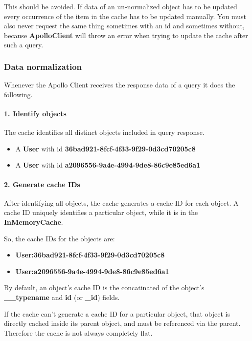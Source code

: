 This should be avoided. If data of an un-normalized object has to be updated every occurrence of the item in the cache has to be updated manually. You must also never request the same thing sometimes with an id and sometimes without, because \textbf{ApolloClient} will throw an error when trying to update the cache after such a query.

\subsubsection{Data normalization}

Whenever the Apollo Client receives the response data of a query it does the following. 

\paragraph{1. Identify objects} 

The cache identifies all distinct objects included in query response.

\begin{itemize}
  \item A \textbf{User} with id \textbf{36bad921-8fcf-4f33-9f29-0d3cd70205c8}
  \item A \textbf{User} with id \textbf{a2096556-9a4e-4994-9de8-86c9e85ed6a1}
\end{itemize}

\paragraph{2. Generate cache IDs} 

After identifying all objects, the cache generates a cache ID for each object. A cache ID uniquely identifies a particular object, while it is in the \textbf{InMemoryCache}.

So, the cache IDs for the objects are: 

\begin{itemize}
  \item \textbf{User:36bad921-8fcf-4f33-9f29-0d3cd70205c8}
  \item \textbf{User:a2096556-9a4e-4994-9de8-86c9e85ed6a1}
\end{itemize}

By default, an object's cache ID is the concatinated of the object's \textbf{\_\_typename} and \textbf{id} (or \textbf{\_id}) fields.

If the cache can't generate a cache ID for a particular object, that object is directly cached inside its parent object, and must be referenced via the parent. Therefore the cache is not always completely flat.


